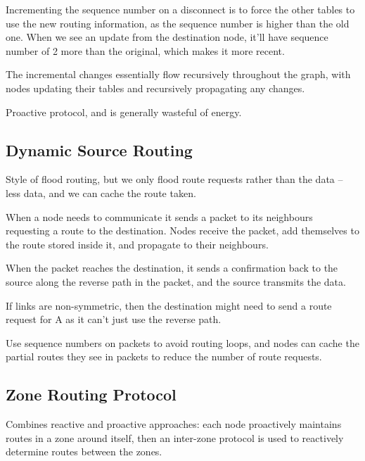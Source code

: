\documentclass[a4paper, 11pt]{article}
\begin{document}
{{        Incrementing the sequence number on a disconnect is to force the other tables to use the new routing information, as the sequence number is higher than the old one. When we see an update from the destination node, it'll have sequence number of 2 more than the original, which makes it more recent.

        The incremental changes essentially flow recursively throughout the graph, with nodes updating their tables and recursively propagating any changes.

        Proactive protocol, and is generally wasteful of energy.
    }
    \subsection*{Dynamic Source Routing}
    {
        Style of flood routing, but we only flood route requests rather than the data -- less data, and we can cache the route taken.

        When a node needs to communicate it sends a packet to its neighbours requesting a route to the destination. Nodes receive the packet, add themselves to the route stored inside it, and propagate to their neighbours.

        When the packet reaches the destination, it sends a confirmation back to the source along the reverse path in the packet, and the source transmits the data.

        If links are non-symmetric, then the destination might need to send a route request for A as it can't just use the reverse path.

        Use sequence numbers on packets to avoid routing loops, and nodes can cache the partial routes they see in packets to reduce the number of route requests.
    }
    \subsection*{Zone Routing Protocol}
    {
        Combines reactive and proactive approaches: each node proactively maintains routes in a zone around itself, then an inter-zone protocol is used to reactively determine routes between the zones.
    }
}
\end{document}
